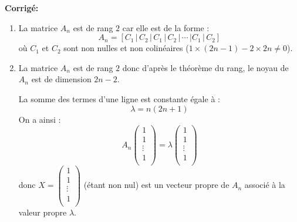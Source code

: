 \documentclass[a4paper,twoside,french,10pt]{VcCours}
\newcommand{\corr}{\textbf{Corrigé:}}
\begin{document}
\corr 

\begin{enumerate}
\item La matrice $A_n$ est de rang $2$ car elle est de la forme :
$$A_n =[C_1 \, \vert \, C_2 \, \vert \, C_1 \, \vert \, C_2 \, \vert \, \cdots \, \vert C_1 \, \vert \, C_2]$$
où $C_1$ et $C_2$ sont non nulles et non colinéaires ($1 \times (2n-1)-2\times 2n \neq 0$).
\item La matrice $A_n$ est de rang $2$ donc d'après le théorème du rang, le noyau de $A_n$ est de dimension $2n-2$. 


La somme des termes d'une ligne est constante égale à :
$$ \lambda = n(2n+1)$$
On a ainsi :
$$ A_n \begin{pmatrix}
1 \\
1 \\
\vdots \\
1 \\
\end{pmatrix} = \lambda \begin{pmatrix}
1 \\
1 \\
\vdots \\
1 \\
\end{pmatrix}$$
donc $X = \begin{pmatrix}
1 \\
1 \\
\vdots \\
1 \\
\end{pmatrix}$ (étant non nul) est un vecteur propre de $A_n$ associé à la valeur propre $\lambda$.



\end{enumerate}
\end{document}

